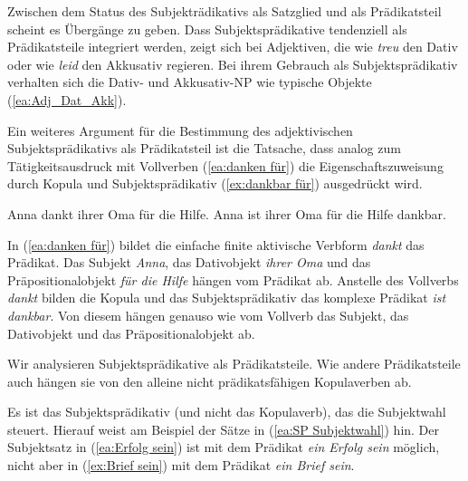 Zwischen dem Status des Subjekträdikativs als Satzglied und als Prädikatsteil scheint es Übergänge zu geben. Dass Subjektsprädikative tendenziell als Prädikatsteile integriert werden, zeigt sich bei Adjektiven, die wie \textit{treu} den Dativ oder wie \textit{leid} den Akkusativ regieren. Bei ihrem Gebrauch als Subjektsprädikativ verhalten sich die Dativ- und Akkusativ-NP wie typische Objekte (\ref{ea:Adj_Dat_Akk}).

\ea \label{ea:Adj_Dat_Akk}
\label{ea:der_Idee_treu} 
\label{ex:*treu_ihrer_Idee}
\label{ex:Dat_treu_VF}
\label{ex:*treu_Dat_VF}
\z 
\z 

Ein weiteres Argument für die Bestimmung des adjektivischen Subjektsprädikativs als Prädikatsteil ist die Tatsache, dass analog zum Tätigkeitsausdruck mit Vollverben (\ref{ea:danken für}) die Eigenschaftszuweisung durch Kopula und Subjektsprädikativ (\ref{ex:dankbar für}) ausgedrückt wird.

\newpage
\ea \label{ea:danken dankbar}
\ea \label{ea:danken für} Anna dankt ihrer Oma für die Hilfe.
\ex \label{ex:dankbar für} Anna ist ihrer Oma für die Hilfe dankbar.
\z 
\z 

In (\ref{ea:danken für}) bildet die einfache finite aktivische Verbform \textit{dankt} das Prädikat. Das Subjekt \textit{Anna}, das Dativobjekt \textit{ihrer Oma} und das Präpositionalobjekt \textit{für die Hilfe} hängen vom Prädikat ab. Anstelle des Vollverbs \textit{dankt} bilden die Kopula und das Subjektsprädikativ das komplexe Prädikat \textit{ist dankbar}. Von diesem hängen genauso wie vom Vollverb das Subjekt, das Dativobjekt und das Präpositionalobjekt ab. 

Wir analysieren Subjektsprädikative als Prädikatsteile. Wie andere Prädikatsteile auch hängen sie von den alleine nicht prädikatsfähigen Kopulaverben ab. 

Es ist das Subjektsprädikativ (und nicht das Kopulaverb), das
die Subjektwahl steuert. Hierauf weist \citet[90]{Eisenberg2020_Satz} am Beispiel der Sätze in (\ref{ea:SP Subjektwahl}) hin. Der Subjektsatz in (\ref{ea:Erfolg sein}) ist mit dem Prädikat \textit{ein Erfolg sein} möglich, nicht aber in (\ref{ex:Brief sein}) mit dem Prädikat \textit{ein Brief sein}. 

